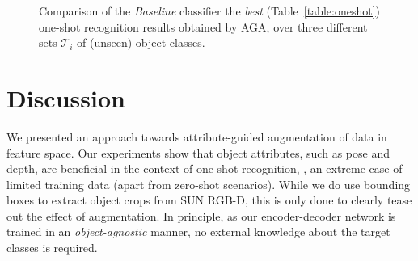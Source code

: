 \documentclass[10pt,twocolumn,letterpaper]{article}
\begin{document}
\begin{figure}
\caption{\label{fig:bestoneshot} Comparison of the \textit{Baseline} 
classifier \vs the \emph{best} (\cf Table~\ref{table:oneshot}) one-shot recognition results obtained by AGA, 
over three different sets $\mathcal{T}_i$ of (unseen) object classes. }
\end{figure}

\section{Discussion}
\label{section:discussion}

We presented an approach towards attribute-guided 
augmentation of data in feature space. Our experiments
show that object attributes, such as pose and depth, are
beneficial in the context of one-shot recognition, \ie,
an extreme case of limited training data (apart from 
zero-shot scenarios). While we do use bounding boxes 
to extract object crops from SUN RGB-D, this is only 
done to clearly tease out the effect of augmentation. 
In principle, as our encoder-decoder network is trained
in an \emph{object-agnostic} manner, no external knowledge 
about the target classes is required. 
\end{document}
